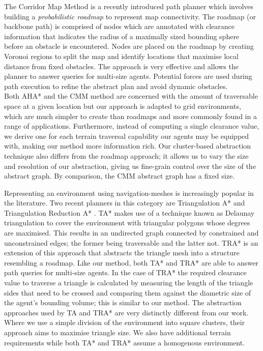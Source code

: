 \indent The Corridor Map Method \cite{geraerts07} is a recently introduced path planner which involves building a \emph{probabilistic roadmap} to represent map connectivity. 
The roadmap (or backbone path) is comprised of nodes which are annotated with clearance information that indicates the radius of a maximally sized bounding sphere before an obstacle is encountered. 
Nodes are placed on the roadmap by creating Voronoi regions to split the map and identify locations that maximise local distance from fixed obstacles. 
The approach is very effective and allows the planner to answer queries for multi-size agents. 
Potential forces are used during path execution to refine the abstract plan and avoid dynamic obstacles. \\
Both AHA* and the CMM method are concerned with the amount of traversable space at a given location but our approach is adapted to grid environments, which are much simpler to create than roadmaps and more commonly found in a range of applications. 
Furthermore, instead of computing a single clearance value, we derive one for each terrain traversal capability our agents may be equipped with, making our method more information rich. 
Our cluster-based abstraction technique also differs from the roadmap approach; it allows us to vary the size and resolution of our abstraction, giving us fine-grain control over the size of the abstract graph. 
By comparison, the CMM abstract graph has a fixed size.
\par 
\indent Representing an environment using navigation-meshes is increasingly popular in the literature. 
Two recent planners in this category are Triangulation A* and Triangulation Reduction A* \cite{demyen07}. 
TA* makes use of a technique known as Delaunay triangulation to cover the environment with triangular polygons whose degrees are maximised. 
This results in an undirected graph connected by constrained and unconstrained edges; the former being traversable and the latter not. 
TRA* is an extension of this approach that abstracts the triangle mesh into a structure resembling a roadmap. 
Like our method, both TA* and TRA* are able to answer path queries for multi-size agents. 
In the case of TRA* the required clearance value to traverse a triangle is calculated by measuring the length of the triangle sides that need to be crossed and comparing them against the diametric size of the agent's bounding volume; this is similar to our method. 
The abstraction approaches used by TA and TRA* are very distinctly different from our work. 
Where we use a simple division of the environment into square clusters, their approach aims to maximise triangle size. 
We also have additional terrain requirements while both TA* and TRA* assume a homogenous environment.

